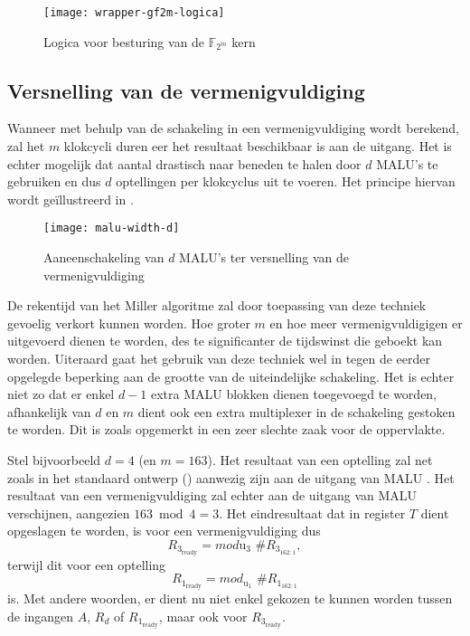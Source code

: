 \begin{figure}[h]
	\centering
		\texttt{[image: wrapper-gf2m-logica]}
		\caption{Logica voor besturing van de $\mathbb{F}_{2^m}$ kern\label{figuur-implementatie-wrapper-gf2m-logica}}
\end{figure}

\subsection{Versnelling van de vermenigvuldiging\label{subsectie-implementatie-gf2m-versnelling}}

Wanneer met behulp van de schakeling in  een vermenigvuldiging wordt berekend, zal het $m$ klokcycli duren eer het resultaat beschikbaar is aan de uitgang. Het is echter mogelijk dat aantal drastisch naar beneden te halen door $d$ MALU's te gebruiken en dus $d$ optellingen per klokcyclus uit te voeren. Het principe hiervan wordt ge\"illustreerd in .

\begin{figure}[h]
	\centering
		\texttt{[image: malu-width-d]}
		\caption{Aaneenschakeling van $d$ MALU's ter versnelling van de vermenigvuldiging\label{figuur-implementatie-wrapper-gf2m-d}}
\end{figure}

De rekentijd van het Miller algoritme zal door toepassing van deze techniek gevoelig verkort kunnen worden. Hoe groter $m$ en hoe meer vermenigvuldigigen er uitgevoerd dienen te worden, des te significanter de tijdswinst die geboekt kan worden. Uiteraard gaat het gebruik van deze techniek wel in tegen de eerder opgelegde beperking aan de grootte van de uiteindelijke schakeling. Het is echter niet zo dat er enkel $d - 1$ extra MALU blokken dienen toegevoegd te worden, afhankelijk van $d$ en $m$ dient ook een extra multiplexer in de schakeling gestoken te worden. Dit is zoals opgemerkt in  een zeer slechte zaak voor de  oppervlakte.

Stel bijvoorbeeld $d = 4$ (en $m = 	163$). Het resultaat van een optelling zal net zoals in het standaard ontwerp () aanwezig zijn aan de uitgang van MALU . Het resultaat van een vermenigvuldiging zal echter aan de uitgang van MALU  verschijnen, aangezien $163 \bmod 4 = 3$. Het eindresultaat dat in register $T$ dient opgeslagen te worden, is voor een vermenigvuldiging dus
\[R_{3_{\text{ready}}} = mod{\text{u}_3} \text{ \# } R_{3_{162:1}},\]
terwijl dit voor een optelling
\[R_{1_{\text{ready}}} = mod_{\text{u}_1} \text{ \# } R_{1_{162:1}}\]
is. Met andere woorden, er dient nu niet enkel gekozen te kunnen worden tussen de ingangen $A$, $R_d$ of $R_{1_{\text{ready}}}$, maar ook voor $R_{3_{\text{ready}}}$.

